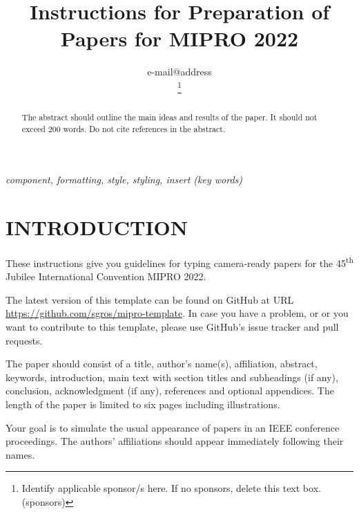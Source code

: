 \documentclass{MIPRO}
\begin{document}
\title{Instructions for Preparation of Papers for MIPRO 2022}

\author{



e-mail@address

\thanks{Identify applicable sponsor/s here. If no sponsors, delete this text box. (sponsors)}
}

\maketitle

\begin{abstract}
The abstract should outline the main ideas and results of the paper. It should not exceed 200 words. Do not cite references in the abstract. 
\end{abstract}

\renewcommand\IEEEkeywordsname{Keywords}
\begin{IEEEkeywords}
\textit{component, formatting, style, styling, insert (key words)}
\end{IEEEkeywords}

\section{INTRODUCTION}

These instructions give you guidelines for typing camera‑ready papers for the 45\textsuperscript{th} Jubilee International Convention MIPRO 2022.

The latest version of this template can be found on GitHub at URL \url{https://github.com/sgros/mipro-template}. In case you have a problem, or or you want to contribute to this template, please use GitHub's issue tracker and pull requests.

The paper should consist of a title, author's name(s), affiliation, abstract, keywords, introduction, main text with section titles and subheadings (if any), conclusion, acknowledgment (if any), references and optional appendices. The length of the paper is limited to six pages including illustrations.

Your goal is to simulate the usual appearance of papers in an IEEE conference proceedings. The authors' affiliations should appear immediately following their names.
\end{document}
